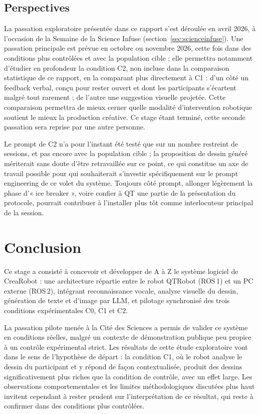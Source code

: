 \documentclass[11pt]{article}
\begin{document}
\subsection{Perspectives}
\label{sec:perspectives}

La passation exploratoire présentée dans ce rapport s'est déroulée en avril 2026, à l'occasion de la Semaine de la Science Infuse (section~\ref{sec:scienceinfuse}).
Une passation principale est prévue en octobre ou novembre 2026, cette fois dans des conditions plus contrôlées et avec la population cible ; elle permettra notamment d'étudier en profondeur la condition C2, non incluse dans la comparaison statistique de ce rapport, en la comparant plus directement à C1 : d'un côté un feedback verbal, conçu pour rester ouvert et dont les participants s'écartent malgré tout rarement ; de l'autre une suggestion visuelle projetée. Cette comparaison permettra de mieux cerner quelle modalité d'intervention robotique soutient le mieux la production créative.
Ce stage étant terminé, cette seconde passation sera reprise par une autre personne.

Le prompt de C2 n'a pour l'instant été testé que sur un nombre restreint de sessions, et pas encore avec la population cible ; la proposition de dessin généré mériterait sans doute d'être retravaillée sur ce point, ce qui constitue un axe de travail possible pour qui souhaiterait s'investir spécifiquement sur le prompt engineering de ce volet du système.
Toujours côté prompt, allonger légèrement la phase d'« ice breaker », voire confier à QT une partie de la présentation du protocole, pourrait contribuer à l'installer plus tôt comme interlocuteur principal de la session.

\newpage
\section{Conclusion}

Ce stage a consisté à concevoir et développer de A à Z le système logiciel de CreaRobot : une architecture répartie entre le robot QTRobot (ROS\,1) et un PC externe (ROS\,2), intégrant reconnaissance vocale, analyse visuelle du dessin, génération de texte et d'image par LLM, et pilotage synchronisé des trois conditions expérimentales C0, C1 et C2.

La passation pilote menée à la Cité des Sciences a permis de valider ce système en conditions réelles, malgré un contexte de démonstration publique peu propice à un contrôle expérimental strict.
Les résultats de cette étude exploratoire vont dans le sens de l'hypothèse de départ : la condition C1, où le robot analyse le dessin du participant et y répond de façon contextualisée, produit des dessins significativement plus riches que la condition de contrôle, avec un effet large.
Les observations comportementales et les limites méthodologiques discutées plus haut invitent cependant à rester prudent sur l'interprétation de ce résultat, qui reste à confirmer dans des conditions plus contrôlées.
\end{document}
